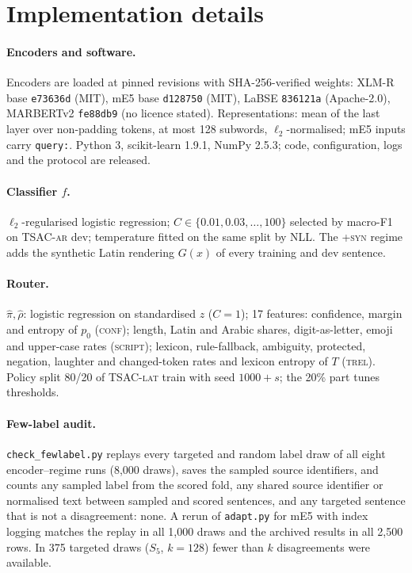 \documentclass[runningheads]{llncs}
\begin{document}
\section*{Implementation details}
\paragraph{Encoders and software.} Encoders are loaded at pinned revisions with SHA-256-verified weights: XLM-R base \texttt{e73636d} (MIT), mE5 base \texttt{d128750} (MIT), LaBSE \texttt{836121a} (Apache-2.0), MARBERTv2 \texttt{fe88db9} (no licence stated). Representations: mean of the last layer over non-padding tokens, at most 128 subwords, $\ell_2$-normalised; mE5 inputs carry \texttt{query:}. Python 3, scikit-learn 1.9.1, NumPy 2.5.3; code, configuration, logs and the protocol are released.

\paragraph{Classifier $f$.} $\ell_2$-regularised logistic regression; $C\in\{0.01,0.03,\ldots,100\}$ selected by macro-F1 on TSAC-\textsc{ar} dev; temperature fitted on the same split by NLL. The \textsc{+syn} regime adds the synthetic Latin rendering $G(x)$ of every training and dev sentence.

\paragraph{Router.} $\hat\pi,\hat\rho$: logistic regression on standardised $z$ ($C=1$); 17 features: confidence, margin and entropy of $p_0$ (\textsc{conf}); length, Latin and Arabic shares, digit-as-letter, emoji and upper-case rates (\textsc{script}); lexicon, rule-fallback, ambiguity, protected, negation, laughter and changed-token rates and lexicon entropy of $T$ (\textsc{trel}). Policy split 80/20 of TSAC-\textsc{lat} train with seed $1000+s$; the 20\% part tunes thresholds. 

\paragraph{Few-label audit.} \texttt{check\_fewlabel.py} replays every targeted and random label draw of all eight encoder--regime runs (8{,}000 draws), saves the sampled source identifiers, and counts any sampled label from the scored fold, any shared source identifier or normalised text between sampled and scored sentences, and any targeted sentence that is not a disagreement: none. A rerun of \texttt{adapt.py} for mE5 with index logging matches the replay in all 1{,}000 draws and the archived results in all 2{,}500 rows. In 375 targeted draws ($S_5$, $k{=}128$) fewer than $k$ disagreements were available.
\end{document}
